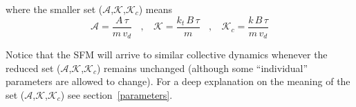 \documentclass[preprint,12pt]{elsarticle}
\begin{document}
\noindent where the smaller set ($\mathcal{A}$,$\mathcal{K}$,$\mathcal{K}_c$) 
means\\

\begin{equation}
 \mathcal{A}=\displaystyle\frac{A\,\tau}{m\,v_d}\ \ \ \ , \ \ \ \ 
 \mathcal{K}=\displaystyle\frac{k_t\,B\,\tau}{m}\ \ \ \ , \ \ \ \
 \mathcal{K}_c=\displaystyle\frac{k\,B\,\tau}{m\,v_d}
\end{equation}

Notice that the SFM will arrive to similar collective dynamics whenever the 
reduced set ($\mathcal{A}$,$\mathcal{K}$,$\mathcal{K}_c$) remains unchanged 
(although some ``individual'' parameters are allowed to change). For a deep 
explanation on the meaning  of the set 
($\mathcal{A}$,$\mathcal{K}$,$\mathcal{K}_c$) see section~\ref{parameters}. \\








\end{document}
